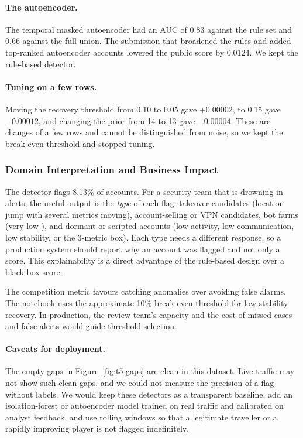 \documentclass[../main.tex]{subfiles}
\begin{document}
\paragraph{The autoencoder.} The temporal masked autoencoder had an AUC of 0.83 against the rule set and 0.66 against the full union. The submission that broadened the rules and added top-ranked autoencoder accounts lowered the public score by 0.0124. We kept the rule-based detector.

\paragraph{Tuning on a few rows.} Moving the recovery threshold from 0.10 to 0.05 gave $+0.00002$, to 0.15 gave $-0.00012$, and changing the prior from 14 to 13 gave $-0.00004$. These are changes of a few rows and cannot be distinguished from noise, so we kept the break-even threshold and stopped tuning.

\subsubsection{Domain Interpretation and Business Impact}

The detector flags 8.13\% of accounts. For a security team that is drowning in alerts, the useful output is the \emph{type} of each flag: takeover candidates (location jump with several metrics moving), account-selling or VPN candidates, bot farms (very low ), and dormant or scripted accounts (low activity, low communication, low stability, or the 3-metric box). Each type needs a different response, so a production system should report why an account was flagged and not only a score. This explainability is a direct advantage of the rule-based design over a black-box score.

The competition metric favours catching anomalies over avoiding false alarms. The notebook uses the approximate 10\% break-even threshold for low-stability recovery. In production, the review team's capacity and the cost of missed cases and false alerts would guide threshold selection.

\paragraph{Caveats for deployment.} The empty gaps in Figure~\ref{fig:t5-gaps} are clean in this dataset. Live traffic may not show such clean gaps, and we could not measure the precision of a flag without labels. We would keep these detectors as a transparent baseline, add an isolation-forest or autoencoder model trained on real traffic and calibrated on analyst feedback, and use rolling windows so that a legitimate traveller or a rapidly improving player is not flagged indefinitely.

\endgroup
\end{document}

